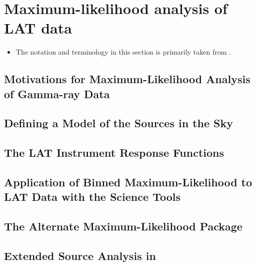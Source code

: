 \chapter{Maximum-likelihood analysis of LAT data}

\begin{itemize}
  \item The notation and terminology in this section 
    is primarily taken from \cite{matthew_kerr_thesis}.
\end{itemize}

\section{Motivations for Maximum-Likelihood Analysis of Gamma-ray Data}


\section{Defining a Model of the Sources in the Sky}


\section{The LAT Instrument Response Functions}


\section{Application of Binned Maximum-Likelihood to LAT Data with the Science Tools}



\section{The Alternate Maximum-Likelihood Package \pointlike}


\section{Extended Source Analysis in \pointlike}
